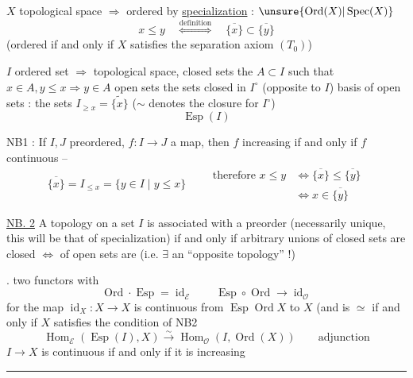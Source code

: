 
$X$ topological space $\Longrightarrow$ ordered by \uline{specialization} : $\unsure{\operatorname{Ord}(X)|\operatorname{Spec}(X)}$
\[
x\leq y\quad\overset{\mathrm{definition}}{\Longleftrightarrow}\quad\overline{\{x\}}\subset\overline{\{y\}}
\]
(ordered if and only if $X$ satisfies the separation axiom $(T_0)$)

$I$ ordered set $\Longrightarrow$ topological space, closed sets the $A\subset I$ such that $x\in A,y\leq x\Rightarrow y\in A$
open sets the sets closed in $I^\circ$ (opposite to $I$)
basis of open sets : the sets $I_{\geq x}=\widetilde{\{x\}}$ ($\sim$ denotes the closure for $I^\circ$)
\[
\operatorname{Esp}(I)
\]

NB1 : If $I,J$ preordered, $f:I\longrightarrow J$
a map, then $f$ increasing if and only if
$f$ continuous --
\[
\overline{\{x\}}=I_{\leq x}=\{y\in I\mid y\leq x\}\qquad
\begin{aligned}
\text{therefore }x\leq y&\Longleftrightarrow\overline{\{x\}}\leq\overline{\{y\}}\\
&\Longleftrightarrow x\in\overline{\{y\}}
\end{aligned}
\]

\uline{NB. 2} A topology on a set $I$ is associated with
a preorder (necessarily unique,  this will be that of
specialization) if and only if arbitrary unions of
closed sets are closed $\Longleftrightarrow$  of open sets
are  (i.e. $\exists$ an ``opposite topology'' !)

. two functors
with
\[
\operatorname{Ord}\cdot\operatorname{Esp}=\operatorname{id}_{\mathcal E}
\qquad
\operatorname{Esp}\circ\operatorname{Ord}\longrightarrow\operatorname{id}_{\mathcal O}
\]
for the map $\operatorname{id}_X:X\longrightarrow X$
is continuous from $\operatorname{Esp}\operatorname{Ord}X$
to $X$ (and is $\simeq$ if and only if $X$
satisfies the condition of NB2
\[
\operatorname{Hom}_{\mathcal E}(\operatorname{Esp}(I),X)\xrightarrow{\sim}
\operatorname{Hom}_{\mathcal O}(I,\operatorname{Ord}(X))\qquad\text{adjunction}
\]
$I\longrightarrow X$ is continuous if and only if it is increasing
\par\noindent\rule{2cm}{0.4pt}

